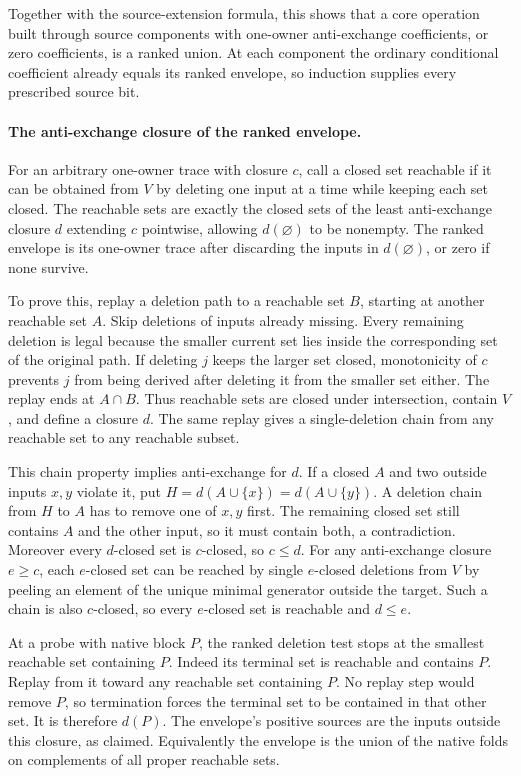 Together with the source-extension formula, this shows
that a core operation built through source components with
one-owner anti-exchange coefficients, or zero coefficients,
is a ranked union. At each component the ordinary
conditional coefficient already equals its ranked envelope,
so induction supplies every prescribed source bit.

\paragraph{The anti-exchange closure of the ranked envelope.}
For an arbitrary one-owner trace with closure $c$, call a
closed set reachable if it can be obtained from $V$ by
deleting one input at a time while keeping each set closed.
The reachable sets are exactly the closed sets of the least
anti-exchange closure $d$ extending $c$ pointwise, allowing
$d(\varnothing)$ to be nonempty. The ranked envelope is
its one-owner trace after discarding the inputs in
$d(\varnothing)$, or zero if none survive.

To prove this, replay a deletion path to a reachable set
$B$, starting at another reachable set $A$. Skip deletions
of inputs already missing. Every remaining deletion is
legal because the smaller current set lies inside the
corresponding set of the original path. If deleting
$j$ keeps the larger set closed, monotonicity of $c$
prevents $j$ from being derived after deleting it from
the smaller set either. The replay ends at $A\cap B$.
Thus reachable sets are closed under intersection, contain
$V$, and define a closure $d$. The same replay gives a
single-deletion chain from any reachable set to any
reachable subset.

This chain property implies anti-exchange for $d$.
If a closed $A$ and two outside inputs $x,y$ violate it,
put $H=d(A\cup\{x\})=d(A\cup\{y\})$. A deletion chain
from $H$ to $A$ has to remove one of $x,y$ first.
The remaining closed set still contains $A$ and the
other input, so it must contain both, a contradiction.
Moreover every $d$-closed set is $c$-closed, so $c\le d$.
For any anti-exchange closure $e\ge c$, each $e$-closed
set can be reached by single $e$-closed deletions from $V$
by peeling an element of the unique minimal generator
outside the target. Such a chain is also $c$-closed,
so every $e$-closed set is reachable and $d\le e$.

At a probe with native block $P$, the ranked deletion
test stops at the smallest reachable set containing $P$.
Indeed its terminal set is reachable and contains $P$.
Replay from it toward any reachable set containing $P$.
No replay step would remove $P$, so termination forces
the terminal set to be contained in that other set.
It is therefore $d(P)$. The envelope's positive sources
are the inputs outside this closure, as claimed. Equivalently
the envelope is the union of the native folds on complements
of all proper reachable sets.

